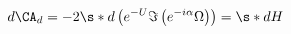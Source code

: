 \begin{equation}
 d \CA_d = - 2 \s* d \left( e^{-U} \Im \left(e^{-i\alpha} \Omega \right) \right)
= \s* d H
\end{equation}

